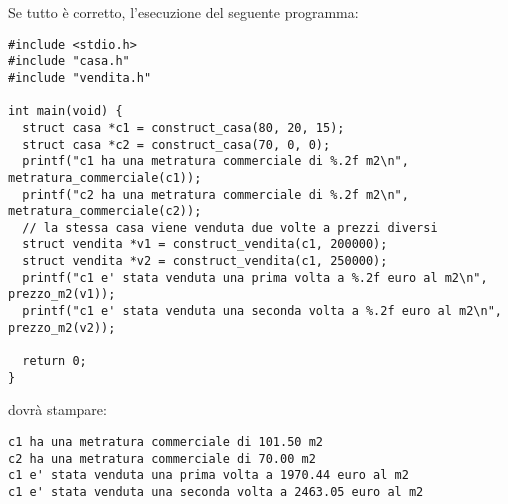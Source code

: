\documentclass[12pt]{article}
\begin{document}
Se tutto \`e corretto, l'esecuzione del seguente programma:

{\small
\begin{verbatim}
#include <stdio.h>
#include "casa.h"
#include "vendita.h"

int main(void) {
  struct casa *c1 = construct_casa(80, 20, 15);
  struct casa *c2 = construct_casa(70, 0, 0);
  printf("c1 ha una metratura commerciale di %.2f m2\n", metratura_commerciale(c1));
  printf("c2 ha una metratura commerciale di %.2f m2\n", metratura_commerciale(c2));
  // la stessa casa viene venduta due volte a prezzi diversi
  struct vendita *v1 = construct_vendita(c1, 200000);
  struct vendita *v2 = construct_vendita(c1, 250000);
  printf("c1 e' stata venduta una prima volta a %.2f euro al m2\n", prezzo_m2(v1));
  printf("c1 e' stata venduta una seconda volta a %.2f euro al m2\n", prezzo_m2(v2));

  return 0;
}
\end{verbatim}}

\noindent
dovr\`a stampare:

{\small
\begin{verbatim}
c1 ha una metratura commerciale di 101.50 m2
c2 ha una metratura commerciale di 70.00 m2
c1 e' stata venduta una prima volta a 1970.44 euro al m2
c1 e' stata venduta una seconda volta a 2463.05 euro al m2
\end{verbatim}}
\end{document}

